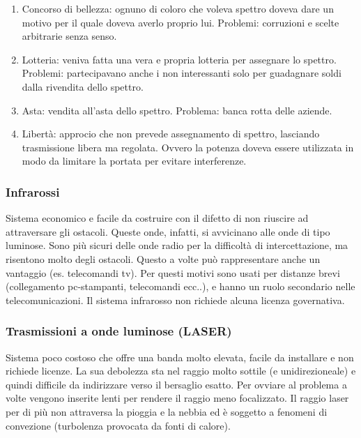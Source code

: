 \begin{enumerate}

\item{Concorso di bellezza: ognuno di coloro che voleva spettro doveva dare un motivo per il quale doveva averlo proprio lui. Problemi: corruzioni e scelte arbitrarie senza senso.}
\item{Lotteria: veniva fatta una vera e propria lotteria per assegnare lo spettro. Problemi: partecipavano anche i non interessanti solo per guadagnare soldi dalla rivendita dello spettro. }
\item{Asta: vendita all'asta dello spettro. Problema: banca rotta delle aziende. }
\item{Libertà: approcio che non prevede assegnamento di spettro, lasciando trasmissione libera ma regolata. Ovvero la potenza doveva essere utilizzata in modo da limitare la portata per evitare interferenze. }

\end{enumerate}

\subsubsection{Infrarossi}

Sistema economico e facile da costruire con il difetto di non riuscire ad attraversare gli ostacoli. Queste onde, infatti, si avvicinano alle onde di tipo luminose. Sono più sicuri delle onde radio per la difficoltà di intercettazione, ma risentono molto degli ostacoli. Questo a volte può rappresentare anche un vantaggio (es. telecomandi tv). Per questi motivi sono usati per distanze brevi (collegamento pc-stampanti, telecomandi ecc..), e hanno un ruolo secondario nelle telecomunicazioni. Il sistema infrarosso non richiede alcuna licenza governativa.

\subsubsection{Trasmissioni a onde luminose (LASER)}

Sistema poco costoso che offre una banda molto elevata, facile da installare e non richiede licenze. La sua debolezza sta nel raggio molto sottile (e unidirezioneale) e quindi difficile da indirizzare verso il bersaglio esatto. Per ovviare al problema a volte vengono inserite lenti per rendere il raggio meno focalizzato. Il raggio laser per di più non attraversa la pioggia e la nebbia ed è soggetto a fenomeni di convezione (turbolenza provocata da fonti di calore).

